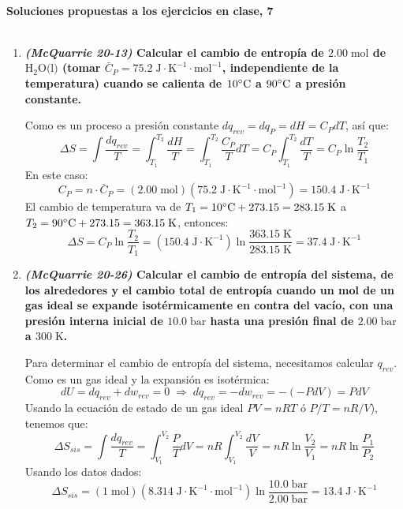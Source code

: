 \documentclass[a4paper,12pt]{article}
\begin{document}

\begin{center}
\HRule \\[0.4cm]
{ \bfseries Soluciones propuestas a los ejercicios en clase, 7}\\ %
\HRule \\[0.4cm]
\end{center}


\begin{enumerate}

 \item \textbf{\textit{(McQuarrie 20-13)} Calcular el cambio de entrop\'ia de $2.00\;\mbox{mol}$ de $\mbox{H}_2\mbox{O(l)}$ (tomar $\bar{C}_P=75.2\;\mbox{J}\cdot\mbox{K}^{-1}\cdot\mbox{mol}^{-1}$, independiente de la temperatura) cuando se calienta de $10\celsius$ a $90\celsius$ a presi\'on constante.} %

Como es un proceso a presi\'on constante $dq_{rev}=dq_P=dH=C_PdT$, as\'i que:
$$\Delta S=\int\frac{dq_{rev}}{T}=\int_{T_1}^{T_2}\frac{dH}{T}=\int_{T_1}^{T_2}\frac{C_P}{T}dT=C_P\int_{T_1}^{T_2}\frac{dT}{T}=C_P\ln\frac{T_2}{T_1}$$
En este caso:
$$C_P=n\cdot\bar{C}_P=(2.00\;\mbox{mol})(75.2\;\mbox{J}\cdot\mbox{K}^{-1}\cdot\mbox{mol}^{-1})=150.4\;\mbox{J}\cdot\mbox{K}^{-1}$$
El cambio de temperatura va de $T_1=10\celsius+273.15=283.15\;\mbox{K}$ a $T_2=90\celsius+273.15=363.15\;\mbox{K}$, entonces:
$$\Delta S=C_P\ln\frac{T_2}{T_1}=(150.4\;\mbox{J}\cdot\mbox{K}^{-1})\ln\frac{363.15\;\mbox{K}}{283.15\;\mbox{K}}=37.4\;\mbox{J}\cdot\mbox{K}^{-1}$$

 \item \textbf{\textit{(McQuarrie 20-26)} Calcular el cambio de entrop\'ia del sistema, de los alrededores y el cambio total de entrop\'ia cuando un mol de un gas ideal se expande isot\'ermicamente en contra del vac\'io, con una presi\'on interna inicial de $10.0\;\mbox{bar}$ hasta una presi\'on final de $2.00\;\mbox{bar}$ a $300\;\mbox{K}$.} %

Para determinar el cambio de entrop\'ia del sistema, necesitamos calcular $q_{rev}$. Como es un gas ideal y la expansi\'on es isot\'ermica: 
$$dU=dq_{rev}+dw_{rev}=0\;\Rightarrow\;dq_{rev}=-dw_{rev}=-(-PdV)=PdV$$ 
Usando la ecuaci\'on de estado de un gas ideal $PV=nRT$ \'o $P/T=nR/V$), tenemos que:
$$\Delta S_{sis}=\int\frac{dq_{rev}}{T}=\int_{V_1}^{V_2}\frac{P}{T}dV=nR\int_{V_1}^{V_2}\frac{dV}{V}=nR\ln\frac{V_2}{V_1}=nR\ln\frac{P_1}{P_2}$$
Usando los datos dados:
$$\Delta S_{sis}=(1\;\mbox{mol})(8.314\;\mbox{J}\cdot\mbox{K}^{-1}\cdot\mbox{mol}^{-1})\ln\frac{10.0\;\mbox{bar}}{2.00\;\mbox{bar}}=13.4\;\mbox{J}\cdot\mbox{K}^{-1}$$


\end{enumerate}
\end{document}
